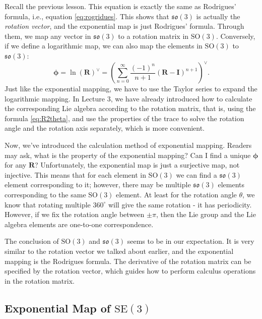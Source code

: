 Recall the previous lesson. This equation is exactly the same as Rodrigues' formula, i.e., equation \eqref{eq:rogridues}. This shows that $\mathfrak{so}(3)$ is actually the \textit{rotation vector}, and the exponential map is just Rodrigues' formula. Through them, we map any vector in $\mathfrak{so}(3)$ to a rotation matrix in $\mathrm{SO}(3)$. Conversely, if we define a logarithmic map, we can also map the elements in $\mathrm{SO}(3)$ to $\mathfrak{so}(3)$:
\begin{equation}
\boldsymbol{\phi} = \ln {\left( \mathbf{R} \right)^ \vee } = {\left( {\sum\limits_{n = 0}^\infty {\frac{{{{ \left( { - 1} \right)}^n}}}{{n + 1}}{{\left( { \mathbf{R} - \mathbf{I}} \right)}^{n + 1 }}} } \right)^ \vee }.
\end{equation}
Just like the exponential mapping, we have to use the Taylor series to expand the logarithmic mapping. In Lecture 3, we have already introduced how to calculate the corresponding Lie algebra according to the rotation matrix, that is, using the formula \eqref{eq:R2theta}, and use the properties of the trace to solve the rotation angle and the rotation axis separately, which is more convenient.

Now, we've introduced the calculation method of exponential mapping. Readers may ask, what is the property of the exponential mapping? Can I find a unique $\boldsymbol{\phi}$ for any $\mathbf{R}$? Unfortunately, the exponential map is just a surjective map, not injective. This means that for each element in $\mathrm{SO}(3)$ we can find a $\mathfrak{so}(3)$ element corresponding to it; however, there may be multiple $\mathfrak{so}(3)$ elements corresponding to the same $\mathrm{SO}(3)$ element. At least for the rotation angle $\theta$, we know that rotating multiple $360^\circ$ will give the same rotation - it has periodicity. However, if we fix the rotation angle between $\pm \pi$, then the Lie group and the Lie algebra elements are one-to-one correspondence.

The conclusion of $\mathrm{SO}(3)$ and $\mathfrak{so}(3)$ seems to be in our expectation. It is very similar to the rotation vector we talked about earlier, and the exponential mapping is the Rodrigues formula. The derivative of the rotation matrix can be specified by the rotation vector, which guides how to perform calculus operations in the rotation matrix.

\subsection{Exponential Map of $\mathrm{SE}(3)$}


